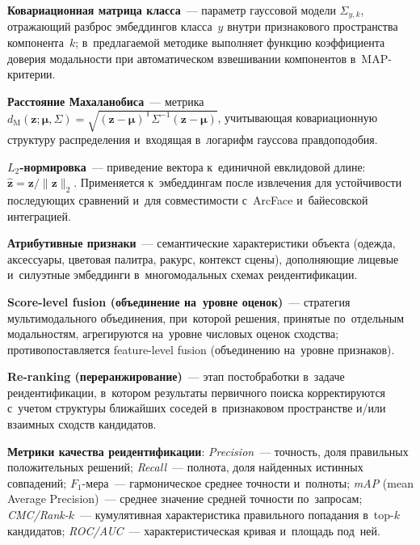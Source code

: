 \textbf{Ковариационная матрица класса}~--- параметр гауссовой модели
$\Sigma_{y,k}$, отражающий разброс эмбеддингов класса~$y$ внутри
признакового пространства компонента~$k$; в~предлагаемой методике
выполняет функцию коэффициента доверия модальности при автоматическом
взвешивании компонентов в~MAP-критерии.

\textbf{Расстояние Махаланобиса}~--- метрика
$d_{\mathrm{M}}(\mathbf{z};\boldsymbol{\mu},\Sigma)=
\sqrt{(\mathbf{z}-\boldsymbol{\mu})^{\mathsf{T}}\Sigma^{-1}(\mathbf{z}-\boldsymbol{\mu})}$,
учитывающая ковариационную структуру распределения и~входящая
в~логарифм гауссова правдоподобия.

\textbf{$L_2$-нормировка}~--- приведение вектора к~единичной евклидовой
длине: $\hat{\mathbf{z}}=\mathbf{z}/\lVert\mathbf{z}\rVert_2$.
Применяется к~эмбеддингам после извлечения для устойчивости последующих
сравнений и~для совместимости с~ArcFace и~байесовской интеграцией.

\textbf{Атрибутивные признаки}~--- семантические характеристики объекта
(одежда, аксессуары, цветовая палитра, ракурс, контекст сцены),
дополняющие лицевые и~силуэтные эмбеддинги в~многомодальных схемах
реидентификации.

\textbf{Score-level fusion (объединение на~уровне оценок)}~---
стратегия мультимодального объединения, при~которой решения, принятые
по~отдельным модальностям, агрегируются на~уровне числовых оценок
сходства; противопоставляется feature-level fusion (объединению
на~уровне признаков).

\textbf{Re-ranking (переранжирование)}~--- этап постобработки в~задаче
реидентификации, в~котором результаты первичного поиска корректируются
с~учетом структуры ближайших соседей в~признаковом пространстве и/или
взаимных сходств кандидатов.

\textbf{Метрики качества реидентификации}: \emph{Precision}~---
точность, доля правильных положительных решений; \emph{Recall}~---
полнота, доля найденных истинных совпадений; $F_1$-мера~--- гармоническое
среднее точности и~полноты; \emph{mAP} (mean Average Precision)~---
среднее значение средней точности по~запросам;
\emph{CMC/Rank-$k$}~--- кумулятивная характеристика правильного
попадания в~top-$k$ кандидатов; \emph{ROC/AUC}~---
характеристическая кривая и~площадь под~ней.
